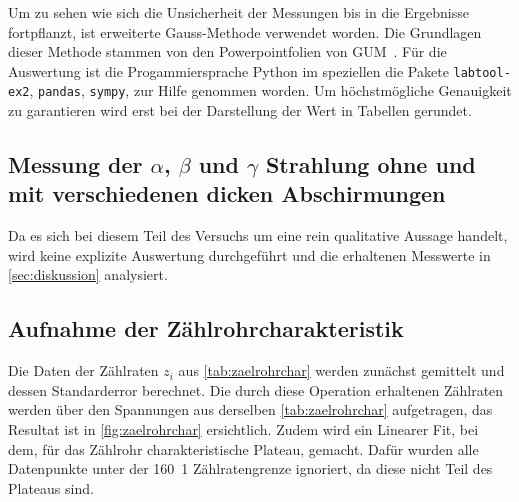 \documentclass[12pt,english,ngerman]{scrartcl}
\begin{document}
Um zu sehen wie sich die Unsicherheit der Messungen bis in die Ergebnisse
fortpflanzt, ist erweiterte Gauss-Methode verwendet worden. Die Grundlagen
dieser Methode stammen von den Powerpointfolien von
GUM~\cite{WolfgangKessel2004}. Für die Auswertung ist die Progammiersprache
Python im speziellen die Pakete \verb#labtool-ex2#, \verb#pandas#,
\verb#sympy#, zur Hilfe genommen worden. Um höchstmögliche Genauigkeit zu
garantieren wird erst bei der Darstellung der Wert in Tabellen gerundet.

\subsection{Messung der \texorpdfstring{$\alpha$}{alpha}, \texorpdfstring{$\beta$}{beta} und
	\texorpdfstring{$\gamma$}{gamma} Strahlung ohne und mit verschiedenen dicken Abschirmungen}

Da es sich bei diesem Teil des Versuchs um eine rein qualitative Aussage
handelt, wird keine explizite Auswertung durchgeführt und die erhaltenen
Messwerte in \autoref{sec:diskussion} analysiert.

\subsection{Aufnahme der Zählrohrcharakteristik}

Die Daten der Zählraten $z_i$ aus \autoref{tab:zaelrohrchar} werden zunächst
gemittelt und dessen Standarderror berechnet. Die durch diese Operation
erhaltenen Zählraten werden über den Spannungen aus derselben
\autoref{tab:zaelrohrchar} aufgetragen, das Resultat ist in
\autoref{fig:zaelrohrchar} ersichtlich. Zudem wird ein Linearer Fit, bei dem,
für das Zählrohr charakteristische Plateau, gemacht. Dafür wurden alle
Datenpunkte unter der \SI{160}{1} Zählratengrenze ignoriert, da diese nicht
Teil des Plateaus sind.
\end{document}
